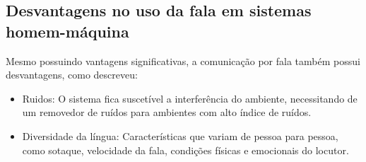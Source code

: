 \subsection{Desvantagens no uso da fala em sistemas homem-máquina}
Mesmo possuindo vantagens significativas, a comunicação por fala também possui desvantagens, como \cite{RavDigitalSadaoki} descreveu:

\begin{itemize}
\item Ruidos: O sistema fica suscetível a interferência do ambiente, necessitando de um removedor de ruídos para ambientes com alto índice de ruídos.
\item Diversidade da língua: Características que variam de pessoa para pessoa, como sotaque, velocidade da fala, condições físicas e emocionais do locutor. 
\end{itemize}

